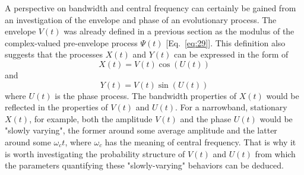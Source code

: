 \documentclass{article}
\begin{document}
A perspective on bandwidth and central frequency can certainly be gained from
an investigation of the envelope and phase of an evolutionary process. The
envelope $V (t)$ was already defined in a previous section as the modulus of
the complex-valued pre-envelope process $\Psi (t)$ [Eq.~\eqref{eq:29}]. This
definition also suggests that the processes $X (t)$ and $Y (t)$ can be
expressed in the form of
\begin{equation}
  X (t) = V (t) \cos (U (t)) \label{eq:48}
\end{equation}
and
\begin{equation}
  Y (t) = V (t) \sin (U (t)) \label{eq:49}
\end{equation}
where $U (t)$ is the phase process. The bandwidth properties of $X (t)$ would
be reflected in the properties of $V (t)$ and $U (t)$. For a narrowband,
stationary $X (t)$, for example, both the amplitude $V (t)$ and the phase $U
(t)$ would be "slowly varying", the former around some average amplitude and
the latter around some $\omega_c t$, where $\omega_c$ has the meaning of
central frequency. That is why it is worth investigating the probability
structure of $V (t)$ and $U (t)$ from which the parameters quantifying these
"slowly-varying" behaviors can be deduced.
\end{document}
